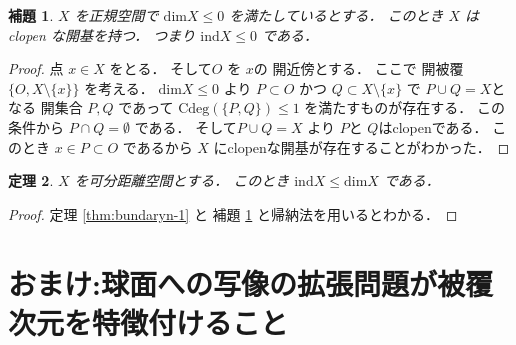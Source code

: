 \documentclass[leqno, a4paper, 12pt]{jsarticle}
\newtheorem{thm}{定理}
\newtheorem{lem}[thm]{補題}
\newcommand{\ind}{\mathrm{ind}}
\newcommand{\yodim}{\mathrm{dim}}
\newcommand{\yodeg}{\mathrm{Cdeg}}
\numberwithin{equation}{section}
\begin{document}
\begin{lem}\label{lem:zerozero}
$X$
を正規空間で
$\yodim X\le 0$
を満たしているとする．
このとき
$X$
はclopen 
な開基を持つ．
つまり
$\ind X\le 0$
である．
\end{lem}
\begin{proof}
点
$x\in X$
をとる．
そして$O$
を
$x$の
開近傍とする．
ここで
開被覆
$\{O, X\setminus \{x\}\}$
を考える．
$\yodim X\le 0$
より
$P\subset O$
かつ
$Q\subset X\setminus \{x\}$
で
$P\cup Q=X$となる
開集合
$P, Q$
であって
$\yodeg(\{P, Q\})\le 1$
を満たすものが存在する．
この条件から
$P\cap Q=\emptyset$
である．
そして$P\cup Q=X$
より
$P$と
$Q$はclopenである．
このとき
$x\in P\subset O$
であるから
$X$
にclopenな開基が存在することがわかった．
\end{proof}


\begin{thm}
$X$
を可分距離空間とする．
このとき
$\ind X\le \yodim X$
である．
\end{thm}
\begin{proof}
定理
\ref{thm:bundaryn-1}
と
補題
\ref{lem:zerozero}
と帰納法を用いるとわかる．
\end{proof}

\section{おまけ:球面への写像の拡張問題が被覆次元を特徴付けること}
\end{document}
